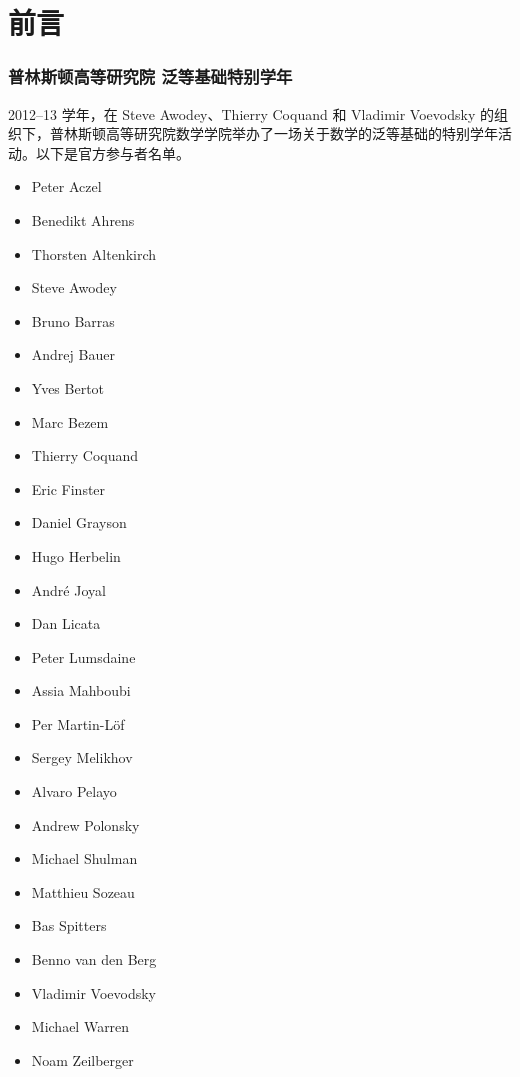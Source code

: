 \chapter*{前言}
\label{cha:preface}

\subsection*{普林斯顿高等研究院 泛等基础特别学年}

2012--13 学年，在 Steve Awodey、Thierry Coquand 和 Vladimir Voevodsky 的组织下，普林斯顿高等研究院数学学院举办了一场关于数学的泛等基础的特别学年活动。以下是官方参与者名单。

\begin{multicols}{\OPTprefacecols}{
\begin{itemize}
\item[] Peter Aczel
\item[] Benedikt Ahrens
\item[] Thorsten Altenkirch
\item[] Steve Awodey
\item[] Bruno Barras
\item[] Andrej Bauer
\item[] Yves Bertot
\item[] Marc Bezem
\item[] Thierry Coquand
\item[] Eric Finster
\item[] Daniel Grayson
\item[] Hugo Herbelin
\item[] Andr\'e Joyal
\item[] Dan Licata
\item[] Peter Lumsdaine
\item[] Assia Mahboubi
\item[] Per Martin-L\"of
\item[] Sergey Melikhov
\item[] Alvaro Pelayo
\item[] Andrew Polonsky
\item[] Michael Shulman
\item[] Matthieu Sozeau
\item[] Bas Spitters
\item[] Benno van den Berg
\item[] Vladimir Voevodsky
\item[] Michael Warren
\item[] Noam Zeilberger
\end{itemize}
}
\end{multicols}

